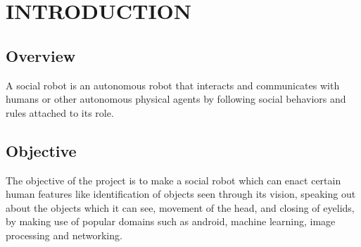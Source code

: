 \documentclass{fisatproject}
\begin{document}
\restoregeometry
\tableofcontents
\newpage

\cleardoublepage
{}
\listoffigures
\newpage

\cleardoublepage
\listoftables
\newpage
\pagestyle{fancy}


\chapter{INTRODUCTION}
\setcounter{page}{1}
\renewcommand{\baselinestretch}{1.50}
\section{Overview}
A social robot is an autonomous robot that interacts and communicates with humans or other autonomous physical agents by following social behaviors and rules attached to its role.

\section{Objective}
The objective of the project is to make a social robot which can enact certain human features like identification of objects seen through its vision, speaking out about the objects which it can see, movement of the head, and closing of eyelids, by making use of popular domains such as android, machine learning, image processing and networking.
\end{document}
